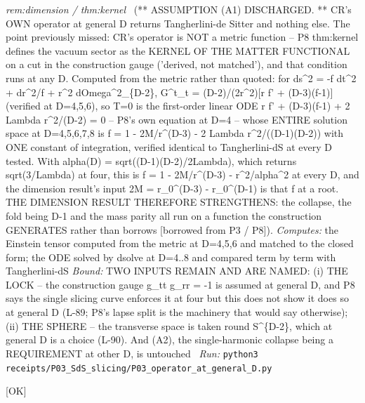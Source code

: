 \begin{description}
\textit{rem:dimension / thm:kernel} \ (** ASSUMPTION (A1) DISCHARGED. ** CR's OWN operator at general D returns Tangherlini-de Sitter and nothing else. The point previously missed: CR's operator is NOT a metric function -- P8 thm:kernel defines the vacuum sector as the KERNEL OF THE MATTER FUNCTIONAL on a cut in the construction gauge ('derived, not matched'), and that condition runs at any D. Computed from the metric rather than quoted: for ds\textasciicircum{}2 = -f dt\textasciicircum{}2 + dr\textasciicircum{}2/f + r\textasciicircum{}2 dOmega\textasciicircum{}2\_\{D-2\}, G\textasciicircum{}t\_t = (D-2)/(2r\textasciicircum{}2)[r f' + (D-3)(f-1)] (verified at D=4,5,6), so T=0 is the first-order linear ODE r f' + (D-3)(f-1) + 2 Lambda r\textasciicircum{}2/(D-2) = 0 -- P8's own equation at D=4 -- whose ENTIRE solution space at D=4,5,6,7,8 is f = 1 - 2M/r\textasciicircum{}(D-3) - 2 Lambda r\textasciicircum{}2/((D-1)(D-2)) with ONE constant of integration, verified identical to Tangherlini-dS at every D tested. With alpha(D) = sqrt((D-1)(D-2)/2Lambda), which returns sqrt(3/Lambda) at four, this is f = 1 - 2M/r\textasciicircum{}(D-3) - r\textasciicircum{}2/alpha\textasciicircum{}2 at every D, and the dimension result's input 2M = r\_0\textasciicircum{}(D-3) - r\_0\textasciicircum{}(D-1) is that f at a root. THE DIMENSION RESULT THEREFORE STRENGTHENS: the collapse, the fold being D-1 and the mass parity all run on a function the construction GENERATES rather than borrows [borrowed from P3 / P8]). 
\emph{Computes:} the Einstein tensor computed from the metric at D=4,5,6 and matched to the closed form; the ODE solved by dsolve at D=4..8 and compared term by term with Tangherlini-dS
 \emph{Bound:} TWO INPUTS REMAIN AND ARE NAMED: (i) THE LOCK -- the construction gauge g\_tt g\_rr = -1 is assumed at general D, and P8 says the single slicing curve enforces it at four but this does not show it does so at general D (L-89; P8's lapse split is the machinery that would say otherwise); (ii) THE SPHERE -- the transverse space is taken round S\textasciicircum{}\{D-2\}, which at general D is a choice (L-90). And (A2), the single-harmonic collapse being a REQUIREMENT at other D, is untouched
\ \emph{Run:} \texttt{python3 receipts/P03\_SdS\_slicing/P03\_operator\_at\_general\_D.py}
\item[\rcptlabel{P17_the_cut_is_planar_only_at_M_zero}{P17R15}\textbf{P17R15}\quad\texttt{P17\_the\_cut\_is\_planar\_only\_at\_M\_zero}]\hfill\textsf{[OK]}\\

\end{description}
